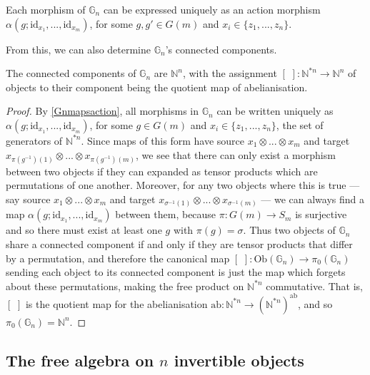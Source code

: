 \documentclass{amsart} %
\begin{document}
\begin{lem} \label{Gnmapsaction} Each morphism of $\mathbb{G}_n$ can be expressed uniquely as an action morphism $\alpha(g; \mathrm{id}_{x_1}, ..., \mathrm{id}_{x_m})$, for some $g, g' \in G(m)$ and $x_i \in \{z_1, ..., z_n \}$. \end{lem}

From this, we can also determine $\mathbb{G}_n$'s connected components. 

\begin{prop}\label{Gnconcomp} The connected components of $\mathbb{G}_n$ are $\mathbb{N}^n$, with the assignment $[ \,\, ] : \mathbb{N}^{*n} \to \mathbb{N}^n$ of objects to their component being the quotient map of abelianisation.
\end{prop}
\begin{proof}
By \cref{Gnmapsaction}, all morphisms in $\mathbb{G}_n$ can be written uniquely as $\alpha(g; \mathrm{id}_{x_1}, ..., \mathrm{id}_{x_m})$, for some $g \in G(m)$ and $x_i \in \{z_1, ..., z_n \}$, the set of generators of $\mathbb{N}^{*n}$. Since maps of this form have source $x_1 \otimes ... \otimes x_m$ and target $x_{\pi(g^{-1})(1)} \otimes ... \otimes x_{\pi(g^{-1})(m)}$, we see that there can only exist a morphism between two objects if they can expanded as tensor products which are permutations of one another. Moreover, for any two objects where this is true --- say source $x_1 \otimes ... \otimes x_m$ and target $x_{\sigma^{-1}(1)} \otimes ... \otimes x_{\sigma^{-1}(m)}$ --- we can always find a map $\alpha(g; \mathrm{id}_{x_1}, ..., \mathrm{id}_{x_m})$ between them, because $\pi: G(m) \to S_m$ is surjective and so there must exist at least one $g$ with $\pi(g) = \sigma$. Thus two objects of $\mathbb{G}_n$ share a connected component if and only if they are tensor products that differ by a permutation, and therefore the canonical map $[ \,\, ] : \mathrm{Ob}(\mathbb{G}_n) \to \pi_0(\mathbb{G}_n)$ sending each object to its connected component is just the map which forgets about these permutations, making the free product on $\mathbb{N}^{*n}$ commutative. That is, $[ \,\, ]$ is the quotient map for the abelianisation $\mathrm{ab} : \mathbb{N}^{*n} \to (\mathbb{N}^{*n})^{\mathrm{ab}}$, and so $\pi_0(\mathbb{G}_n) = \mathbb{N}^n$.
\end{proof}

\subsection{The free algebra on $n$ invertible objects}
\end{document}
